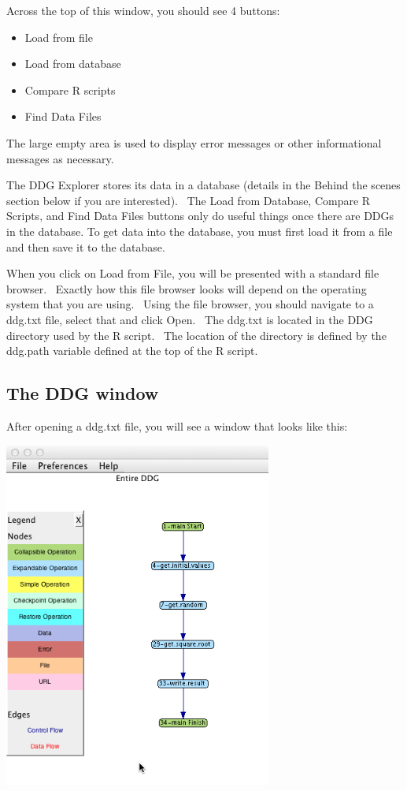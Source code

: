 \documentclass[letterpaper]{article}
\newcommand\liststyleWWviiiNumii{%
\renewcommand\labelitemi{•}
\renewcommand\labelitemii{•}
\renewcommand\labelitemiii{•}
\renewcommand\labelitemiv{•}
}
\begin{document}
{\mdseries\upshape\color{black}
Across the top of this window, you should see 4 buttons:}

\liststyleWWviiiNumii
\begin{itemize}
\item {\color{black}
Load from file}
\item {\color{black}
Load from database}
\item {\color{black}
Compare R scripts}
\item {\color{black}
Find Data Files}
\end{itemize}
{\mdseries\upshape\color{black}
The large empty area is used to display error messages or other informational messages as necessary.}

{\mdseries\upshape\color{black}
The DDG Explorer stores its data in a database (details in the Behind the scenes section below if you are interested). \ The Load from Database, Compare R Scripts, and Find Data Files buttons only do useful things once there are DDGs in the database. To get data into the database, you must first load it from a file and then save it to the database.}

{\mdseries\upshape\color{black}
When you click on Load from File, you will be presented with a standard file browser. \ Exactly how this file browser looks will depend on the operating system that you are using. \ Using the file browser, you should navigate to a ddg.txt file, select that and click Open. \ The ddg.txt is located in the DDG directory used by the R script. \ The location of the directory is defined by the ddg.path variable defined at the top of the R script.}

\subsection{The DDG window}
{\mdseries\upshape\color{black}
After opening a ddg.txt file, you will see a window that looks like this:}

 \includegraphics[width=3.472in,height=4.4866in]{UsingDDGExplorer-img/UsingDDGExplorer-img002.png} 
\end{document}
